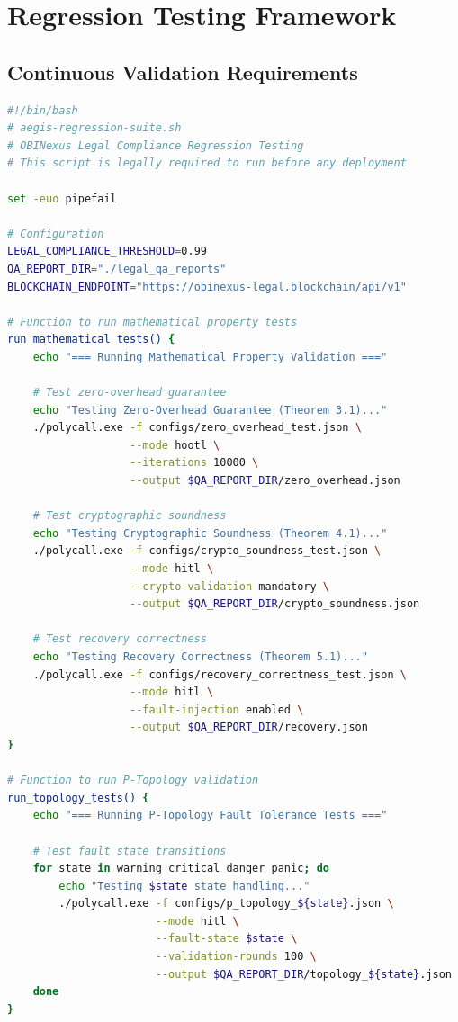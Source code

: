 \documentclass[12pt,a4paper]{article}
\begin{document}
\section{Regression Testing Framework}

\subsection{Continuous Validation Requirements}

\begin{lstlisting}[language=bash, caption=Automated Regression Test Suite]
#!/bin/bash
# aegis-regression-suite.sh
# OBINexus Legal Compliance Regression Testing
# This script is legally required to run before any deployment

set -euo pipefail

# Configuration
LEGAL_COMPLIANCE_THRESHOLD=0.99
QA_REPORT_DIR="./legal_qa_reports"
BLOCKCHAIN_ENDPOINT="https://obinexus-legal.blockchain/api/v1"

# Function to run mathematical property tests
run_mathematical_tests() {
    echo "=== Running Mathematical Property Validation ==="
    
    # Test zero-overhead guarantee
    echo "Testing Zero-Overhead Guarantee (Theorem 3.1)..."
    ./polycall.exe -f configs/zero_overhead_test.json \
                   --mode hootl \
                   --iterations 10000 \
                   --output $QA_REPORT_DIR/zero_overhead.json
    
    # Test cryptographic soundness
    echo "Testing Cryptographic Soundness (Theorem 4.1)..."
    ./polycall.exe -f configs/crypto_soundness_test.json \
                   --mode hitl \
                   --crypto-validation mandatory \
                   --output $QA_REPORT_DIR/crypto_soundness.json
    
    # Test recovery correctness
    echo "Testing Recovery Correctness (Theorem 5.1)..."
    ./polycall.exe -f configs/recovery_correctness_test.json \
                   --mode hitl \
                   --fault-injection enabled \
                   --output $QA_REPORT_DIR/recovery.json
}

# Function to run P-Topology validation
run_topology_tests() {
    echo "=== Running P-Topology Fault Tolerance Tests ==="
    
    # Test fault state transitions
    for state in warning critical danger panic; do
        echo "Testing $state state handling..."
        ./polycall.exe -f configs/p_topology_${state}.json \
                       --mode hitl \
                       --fault-state $state \
                       --validation-rounds 100 \
                       --output $QA_REPORT_DIR/topology_${state}.json
    done
}


\end{lstlisting}
\end{document}
